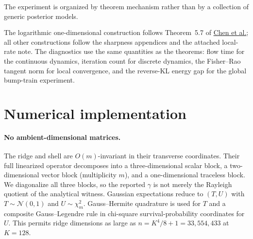 \documentclass[11pt]{article}
\begin{document}
The experiment is organized by theorem mechanism rather than by a collection
of generic posterior models.
\begin{center}
\end{center}
The logarithmic one-dimensional construction follows Theorem~5.7 of \href{https://arxiv.org/html/2310.03597v3}{Chen et
al.}; all other constructions follow the sharpness appendices and the attached
local-rate note.  The diagnostics use the same quantities as the theorems:
flow time for the continuous dynamics, iteration count for discrete dynamics,
the Fisher--Rao tangent norm for local convergence, and the reverse-KL energy
gap for the global bump-train experiment.

\section{Numerical implementation}

\paragraph{No ambient-dimensional matrices.}
The ridge and shell are $O(m)$-invariant in their transverse coordinates.
Their full linearized operator decomposes into a three-dimensional scalar
block, a two-dimensional vector block (multiplicity $m$), and a one-dimensional
traceless block.  We diagonalize all three blocks, so the reported $\gamma$ is
not merely the Rayleigh quotient of the analytical witness.  Gaussian
expectations reduce to $(T,U)$ with $T\sim\mathcal N(0,1)$ and
$U\sim\chi_m^2$.  Gauss--Hermite quadrature is used for $T$ and a composite
Gauss--Legendre rule in chi-square survival-probability coordinates for $U$.
This permits ridge dimensions as large as $n=K^4/8+1=33{,}554{,}433$ at
$K=128$.
\end{document}
